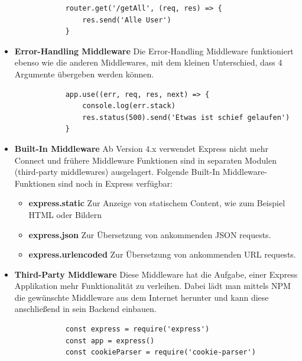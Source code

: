 \begin{itemize}
        \begin{lstlisting}
            router.get('/getAll', (req, res) => {
                res.send('Alle User')
            }
        \end{lstlisting}
    \item \textbf{Error-Handling Middleware}
        \newline
        Die Error-Handling Middleware funktioniert ebenso wie die anderen Middlewares, mit dem kleinen Unterschied, dass 4 Argumente übergeben werden können.
        \begin{lstlisting}
            app.use((err, req, res, next) => {
                console.log(err.stack)
                res.status(500).send('Etwas ist schief gelaufen')
            }
        \end{lstlisting}
    \item \textbf{Built-In Middleware}
        \newline
        Ab Version 4.x verwendet Express nicht mehr Connect und frühere Middleware Funktionen sind in separaten Modulen (third-party middlewares) ausgelagert. Folgende Built-In Middleware-Funktionen sind noch in Express verfügbar:
        \begin{itemize}
            \item \textbf{express.static}
                \newline
                Zur Anzeige von statischem Content, wie zum Beispiel HTML oder Bildern
            \item \textbf{express.json}
                \newline
                Zur Übersetzung von ankommenden JSON requests.
            \item \textbf{express.urlencoded}
                \newline
                Zur Übersetzung von ankommenden URL requests.
        \end{itemize}
    \item \textbf{Third-Party Middleware}
        \newline
        Diese Middleware hat die Aufgabe, einer Express Applikation mehr Funktionalität zu verleihen. Dabei lädt man mittels NPM die gewünschte Middleware aus dem Internet herunter und kann diese anschließend in sein Backend einbauen.
        \begin{lstlisting}
            const express = require('express')
            const app = express()
            const cookieParser = require('cookie-parser')


\end{lstlisting}
\end{itemize}
